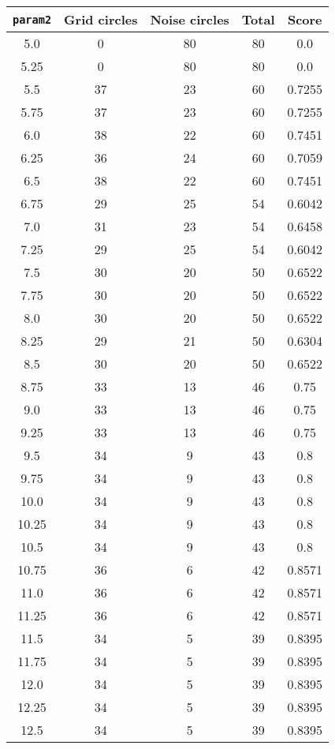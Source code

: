 \documentclass[letterpaper, 12pt]{article}
\begin{document}
\begin{longtable}{|c|c|c|c|c|}
\hline
\textbf{\texttt{param2}} & \textbf{Grid circles} & \textbf{Noise circles} & \textbf{Total} & \textbf{Score} \\
\hline
5.0 & 0 & 80 & 80 & 0.0 \\
\hline
5.25 & 0 & 80 & 80 & 0.0 \\
\hline
5.5 & 37 & 23 & 60 & 0.7255 \\
\hline
5.75 & 37 & 23 & 60 & 0.7255 \\
\hline
6.0 & 38 & 22 & 60 & 0.7451 \\
\hline
6.25 & 36 & 24 & 60 & 0.7059 \\
\hline
6.5 & 38 & 22 & 60 & 0.7451 \\
\hline
6.75 & 29 & 25 & 54 & 0.6042 \\
\hline
7.0 & 31 & 23 & 54 & 0.6458 \\
\hline
7.25 & 29 & 25 & 54 & 0.6042 \\
\hline
7.5 & 30 & 20 & 50 & 0.6522 \\
\hline
7.75 & 30 & 20 & 50 & 0.6522 \\
\hline
8.0 & 30 & 20 & 50 & 0.6522 \\
\hline
8.25 & 29 & 21 & 50 & 0.6304 \\
\hline
8.5 & 30 & 20 & 50 & 0.6522 \\
\hline
8.75 & 33 & 13 & 46 & 0.75 \\
\hline
9.0 & 33 & 13 & 46 & 0.75 \\
\hline
9.25 & 33 & 13 & 46 & 0.75 \\
\hline
9.5 & 34 & 9 & 43 & 0.8 \\
\hline
9.75 & 34 & 9 & 43 & 0.8 \\
\hline
10.0 & 34 & 9 & 43 & 0.8 \\
\hline
10.25 & 34 & 9 & 43 & 0.8 \\
\hline
10.5 & 34 & 9 & 43 & 0.8 \\
\hline
10.75 & 36 & 6 & 42 & 0.8571 \\
\hline
11.0 & 36 & 6 & 42 & 0.8571 \\
\hline
11.25 & 36 & 6 & 42 & 0.8571 \\
\hline
11.5 & 34 & 5 & 39 & 0.8395 \\
\hline
11.75 & 34 & 5 & 39 & 0.8395 \\
\hline
12.0 & 34 & 5 & 39 & 0.8395 \\
\hline
12.25 & 34 & 5 & 39 & 0.8395 \\
\hline
12.5 & 34 & 5 & 39 & 0.8395 \\

\end{longtable}
\end{document}
